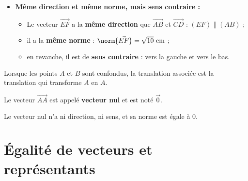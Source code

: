 \begin{exemple}
\begin{itemize}
		\item \textbf{Même direction et même norme, mais sens contraire :}
			\begin{itemize}
				\item Le vecteur $\vec{EF}$ a la \textbf{même direction} que $\vec{AB}$ et $\vec{CD}$ : $(EF) \parallel (AB)$ ;
				\item il a la \textbf{même norme} : $\norm{\vec{EF}} = \sqrt{10}\text{ cm}$ ;
				\item en revanche, il est de \textbf{sens contraire} : vers la gauche et vers le bas.
			\end{itemize}
	\end{itemize}
\end{exemple}

\begin{definition}
	Lorsque les points $A$ et $B$ sont confondus, la translation associée est la translation qui transforme $A$ en $A$.

	Le vecteur $\vec{AA}$ est appelé \textbf{vecteur nul} et est noté $\vec{0}$.
\end{definition}

\begin{remarque}
	Le vecteur nul n'a ni direction, ni sens, et sa norme est égale à $0$.
\end{remarque}

\section{Égalité de vecteurs et représentants}

